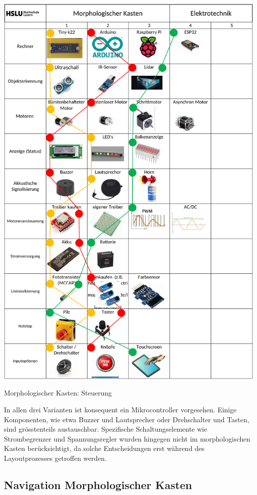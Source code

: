 \begin{table}[H]
\centering
\includegraphics[width=\textwidth -5mm]{assets/MK_Elektrotechnik.pdf}
\caption{Morphologischer Kasten: Steuerung}
\label{table:mk-elektrotechnik}
\end{table}

In allen drei Varianten ist konsequent ein Mikrocontroller vorgesehen. Einige Komponenten, wie etwa Buzzer und Lautsprecher oder Drehschalter und Tasten, sind grösstenteils austauschbar. Spezifische Schaltungselemente wie Strombegrenzer und Spannungsregler wurden hingegen nicht im morphologischen Kasten berücksichtigt, da solche Entscheidungen erst während des Layoutprozesses getroffen werden.


\subsection{Navigation Morphologischer Kasten}

